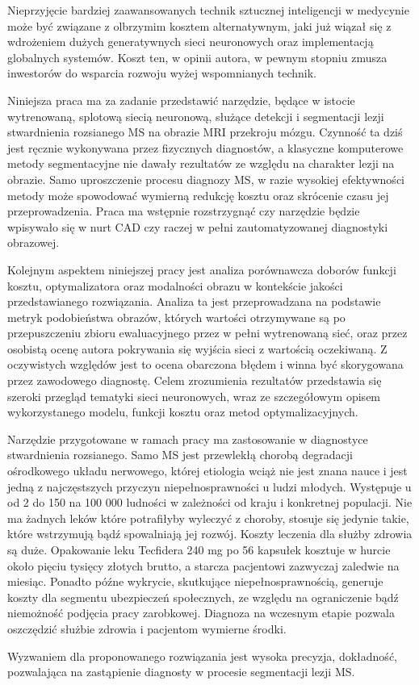 \par
Nieprzyjęcie bardziej zaawansowanych technik sztucznej inteligencji w medycynie może być związane z olbrzymim kosztem alternatywnym, jaki już wiązał się z wdrożeniem dużych generatywnych sieci neuronowych oraz implementacją globalnych systemów. Koszt ten, w opinii autora, w pewnym stopniu zmusza inwestorów do wsparcia rozwoju wyżej wspomnianych technik.
\par 
Niniejsza praca ma za zadanie przedstawić narzędzie, będące w istocie wytrenowaną, splotową siecią neuronową, służące detekcji i segmentacji lezji stwardnienia rozsianego MS  na obrazie MRI przekroju mózgu. Czynność ta dziś jest ręcznie wykonywana przez fizycznych diagnostów, a klasyczne komputerowe metody segmentacyjne nie dawały rezultatów ze względu na charakter lezji na obrazie. Samo uproszczenie procesu diagnozy MS, w razie wysokiej efektywności metody może spowodować wymierną redukcję kosztu oraz skrócenie czasu jej przeprowadzenia. Praca ma wstępnie rozstrzygnąć czy narzędzie będzie wpisywało się w nurt CAD czy raczej w pełni zautomatyzowanej diagnostyki obrazowej. 
\par
Kolejnym aspektem niniejszej pracy jest analiza porównawcza doborów funkcji kosztu, optymalizatora oraz modalności obrazu w kontekście jakości przedstawianego rozwiązania. Analiza ta jest przeprowadzana na podstawie metryk podobieństwa obrazów, których wartości otrzymywane są po przepuszczeniu zbioru ewaluacyjnego przez w pełni wytrenowaną sieć, oraz przez osobistą ocenę autora pokrywania się wyjścia sieci z wartością oczekiwaną. Z oczywistych względów jest to ocena obarczona błędem i winna być skorygowana przez zawodowego diagnostę. Celem zrozumienia rezultatów przedstawia się szeroki przegląd tematyki sieci neuronowych, wraz ze szczegółowym opisem wykorzystanego modelu, funkcji kosztu oraz metod optymalizacyjnych.
\par 
Narzędzie przygotowane w ramach pracy ma zastosowanie w diagnostyce stwardnienia rozsianego. Samo MS jest przewlekłą chorobą degradacji ośrodkowego układu nerwowego, której etiologia wciąż nie jest znana nauce\cite{ZEPHIR2018358} i jest jedną z najczęstszych przyczyn niepełnosprawności u ludzi młodych. Występuje u od 2 do 150 na 100 000 ludności w zależności od kraju i konkretnej populacji\cite{Rosati2001}. Nie ma żadnych leków które potrafiłyby wyleczyć z choroby, stosuje się jedynie takie, które wstrzymują bądź spowalniają jej rozwój. Koszty leczenia dla służby zdrowia są duże. Opakowanie leku Tecfidera 240 mg po 56 kapsułek kosztuje w hurcie około pięciu tysięcy złotych brutto, a starcza pacjentowi zazwyczaj zaledwie na miesiąc. Ponadto późne wykrycie, skutkujące niepełnosprawnością, generuje koszty dla segmentu ubezpieczeń społecznych, ze względu na ograniczenie bądź niemożność podjęcia pracy zarobkowej. Diagnoza na wczesnym etapie pozwala oszczędzić służbie zdrowia i pacjentom wymierne środki.
\par
Wyzwaniem dla proponowanego rozwiązania jest wysoka precyzja, dokładność, pozwalająca na zastąpienie diagnosty w procesie segmentacji lezji MS. 


